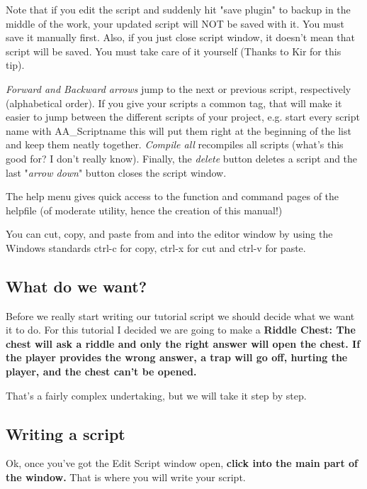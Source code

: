 \documentclass[
]{article}
\begin{document}
Note that if you edit the script and suddenly hit "save plugin" to
backup in the middle of the work, your updated script will NOT be saved
with it. You must save it manually first. Also, if you just close script
window, it doesn't mean that script will be saved. You must take care of
it yourself (Thanks to Kir for this tip).

\emph{Forward and Backward arrows} jump to the next or previous script,
respectively (alphabetical order). If you give your scripts a common
tag, that will make it easier to jump between the different scripts of
your project, e.g. start every script name with AA\_Scriptname this will
put them right at the beginning of the list and keep them neatly
together. \emph{Compile all} recompiles all scripts (what's this good
for? I don't really know). Finally, the \emph{delete} button deletes a
script and the last "\emph{arrow down}" button closes the script window.

The help menu gives quick access to the function and command pages of
the helpfile (of moderate utility, hence the creation of this manual!)

You can cut, copy, and paste from and into the editor window by using
the Windows standards ctrl-c for copy, ctrl-x for cut and ctrl-v for
paste.

\hypertarget{what-do-we-want}{%
\subsection{What do we want?}\label{what-do-we-want}}

Before we really start writing our tutorial script we should decide what
we want it to do. For this tutorial I decided we are going to make a
\textbf{Riddle Chest: The chest will ask a riddle and only the right
answer will open the chest. If the player provides the wrong answer, a
trap will go off, hurting the player, and the chest can't be opened.}

That's a fairly complex undertaking, but we will take it step by step.

\hypertarget{writing-a-script}{%
\subsection{Writing a script}\label{writing-a-script}}

Ok, once you've got the Edit Script window open, \textbf{click into the
main part of the window.} That is where you will write your script.
\end{document}
